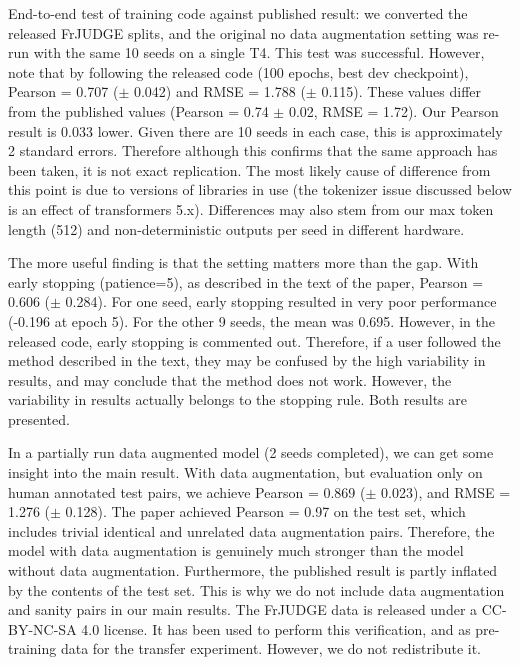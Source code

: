 \documentclass[conference]{IEEEtran}
\begin{document}
End-to-end test of training code against published result: we converted the released FrJUDGE splits, and the original no data augmentation setting was re-run with the same 10 seeds on a single T4. This test was successful. However, note that by following the released code (100 epochs, best dev checkpoint), Pearson = 0.707 (\ensuremath{\pm} 0.042) and RMSE = 1.788 (\ensuremath{\pm} 0.115). These values differ from the published values (Pearson = 0.74 \ensuremath{\pm} 0.02, RMSE = 1.72). Our Pearson result is 0.033 lower. Given there are 10 seeds in each case, this is approximately 2 standard errors. Therefore although this confirms that the same approach has been taken, it is not exact replication. The most likely cause of difference from this point is due to versions of libraries in use (the tokenizer issue discussed below is an effect of transformers 5.x). Differences may also stem from our max token length (512) and non-deterministic outputs per seed in different hardware.

The more useful finding is that the setting matters more than the gap. With early stopping (patience=5), as described in the text of the paper, Pearson = 0.606 (\ensuremath{\pm} 0.284). For one seed, early stopping resulted in very poor performance (-0.196 at epoch 5). For the other 9 seeds, the mean was 0.695. However, in the released code, early stopping is commented out. Therefore, if a user followed the method described in the text, they may be confused by the high variability in results, and may conclude that the method does not work. However, the variability in results actually belongs to the stopping rule. Both results are presented.

In a partially run data augmented model (2 seeds completed), we can get some insight into the main result. With data augmentation, but evaluation only on human annotated test pairs, we achieve Pearson = 0.869 (\ensuremath{\pm} 0.023), and RMSE = 1.276 (\ensuremath{\pm} 0.128). The paper achieved Pearson = 0.97 on the test set, which includes trivial identical and unrelated data augmentation pairs. Therefore, the model with data augmentation is genuinely much stronger than the model without data augmentation. Furthermore, the published result is partly inflated by the contents of the test set. This is why we do not include data augmentation and sanity pairs in our main results. The FrJUDGE data is released under a CC-BY-NC-SA 4.0 license. It has been used to perform this verification, and as pre-training data for the transfer experiment. However, we do not redistribute it.
\end{document}
